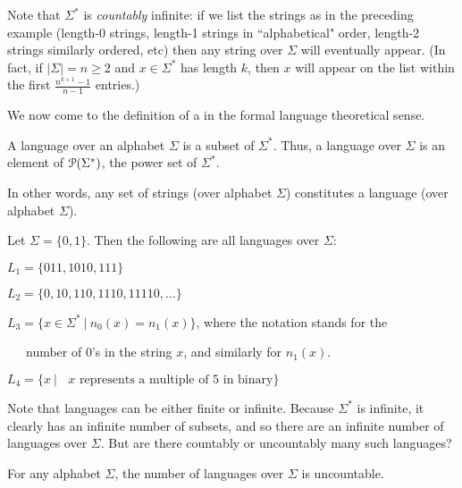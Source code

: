 \smallskip

Note that $\Sigma^*$ is \emph{countably} infinite: if we list the strings as in
the preceding example (length-0 strings, length-1 strings in ``alphabetical"
order, length-2 strings similarly ordered, etc) then any string over $\Sigma$
will eventually appear.  (In fact, if $|\Sigma| = n \geq 2$ and $x \in \Sigma^*$ has
length $k$, then $x$ will appear on the list within the first $\frac{n^{k+1} -
1}{n-1}$ entries.)

\bigskip

We now come to the definition of a  in the formal language
theoretical sense.


\begin{definition} A language over an alphabet $\Sigma$ is a subset
of $\Sigma^*$.  Thus, a language over $\Sigma$ is an element of
${\cal P}(\Sigma^*)$, the power set of $\Sigma^*$.
\end{definition}

\smallskip
In other words, any set of strings (over alphabet $\Sigma$) constitutes a
language (over alphabet $\Sigma$).

\smallskip

\begin{example} Let $\Sigma = \{0,1\}$.  Then the following are all
languages over $\Sigma$:

$L_1 = \{011, 1010, 111\}$

$L_2 = \{0, 10, 110, 1110, 11110, \ldots\}$

$L_3 = \{x \in \Sigma^* \ | \ n_0(x) = n_1(x) \}$, where the notation 
stands for the 

\ \ \ number of 0's in the string $x$, and similarly for $n_1(x)$.

$L_4 = \{x \ | \ \mbox{\ $x$ represents a multiple of 5 in binary}\}$
\end{example}

\smallskip

Note that languages can be either finite or infinite.
Because $\Sigma^*$ is infinite, it clearly has an
infinite number of subsets, and so there are an infinite number of languages
over $\Sigma$.  But are there countably or uncountably many such languages?

\smallskip

\begin{theorem}
For any alphabet $\Sigma$, the number of languages over $\Sigma$ is
uncountable.
\end{theorem}

